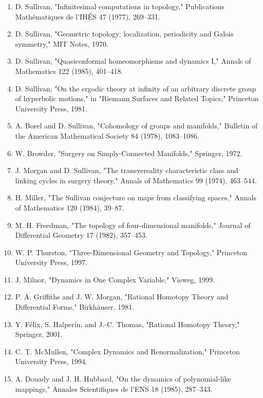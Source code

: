 \begin{enumerate}
\item D. Sullivan, "Infinitesimal computations in topology," Publications Math\'ematiques de l'IH\'ES 47 (1977), 269--331.
\item D. Sullivan, "Geometric topology: localization, periodicity and Galois symmetry," MIT Notes, 1970.
\item D. Sullivan, "Quasiconformal homeomorphisms and dynamics I," Annals of Mathematics 122 (1985), 401--418.
\item D. Sullivan, "On the ergodic theory at infinity of an arbitrary discrete group of hyperbolic motions," in "Riemann Surfaces and Related Topics," Princeton University Press, 1981.
\item A. Borel and D. Sullivan, "Cohomology of groups and manifolds," Bulletin of the American Mathematical Society 84 (1978), 1083--1086.
\item W. Browder, "Surgery on Simply-Connected Manifolds," Springer, 1972.
\item J. Morgan and D. Sullivan, "The transversality characteristic class and linking cycles in surgery theory," Annals of Mathematics 99 (1974), 463--544.
\item H. Miller, "The Sullivan conjecture on maps from classifying spaces," Annals of Mathematics 120 (1984), 39--87.
\item M. H. Freedman, "The topology of four-dimensional manifolds," Journal of Differential Geometry 17 (1982), 357--453.
\item W. P. Thurston, "Three-Dimensional Geometry and Topology," Princeton University Press, 1997.
\item J. Milnor, "Dynamics in One Complex Variable," Vieweg, 1999.
\item P. A. Griffiths and J. W. Morgan, "Rational Homotopy Theory and Differential Forms," Birkh\"auser, 1981.
\item Y. F\'elix, S. Halperin, and J.-C. Thomas, "Rational Homotopy Theory," Springer, 2001.
\item C. T. McMullen, "Complex Dynamics and Renormalization," Princeton University Press, 1994.
\item A. Douady and J. H. Hubbard, "On the dynamics of polynomial-like mappings," Annales Scientifiques de l'ENS 18 (1985), 287--343.
\end{enumerate}
